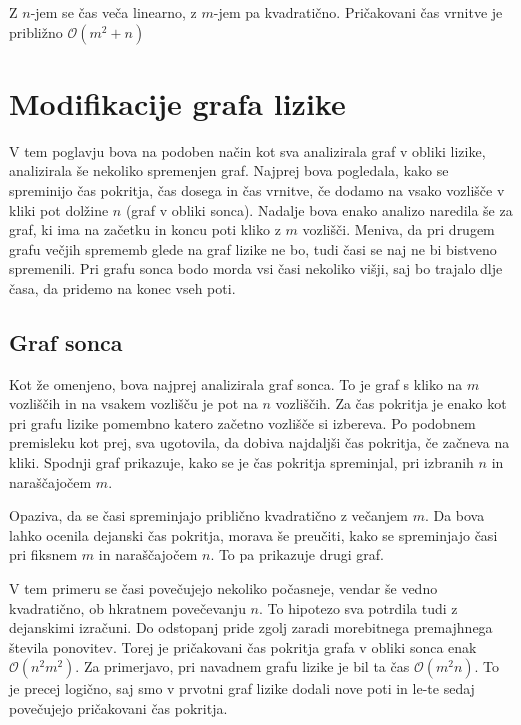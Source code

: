 \documentclass[12pt,a4paper]{amsart}
\begin{document}
Z $n$-jem se čas veča linearno, z $m$-jem pa kvadratično. Pričakovani čas vrnitve je približno $\mathcal{O}(m^2+n)$


\section{Modifikacije grafa lizike}
V tem poglavju bova na podoben način kot sva analizirala graf v obliki lizike, analizirala še nekoliko spremenjen graf. 
Najprej bova pogledala, kako se spreminijo čas pokritja, čas dosega in čas vrnitve, 
če dodamo na vsako vozlišče v kliki pot dolžine $n$ (graf v obliki sonca).
Nadalje bova enako analizo naredila še za graf, ki ima na začetku in koncu poti kliko z $m$ vozlišči. 
Meniva, da pri drugem grafu večjih sprememb glede na graf lizike ne bo, tudi časi se naj ne bi bistveno spremenili.
Pri grafu sonca bodo morda vsi časi nekoliko višji, saj bo trajalo dlje časa, da pridemo na konec vseh poti.

\subsection{Graf sonca}

Kot že omenjeno, bova najprej analizirala graf sonca. 
To je graf s kliko na $m$ vozliščih in na vsakem vozlišču je pot na $n$ vozliščih. Za čas pokritja je enako kot
pri grafu lizike pomembno katero začetno vozlišče si izbereva. Po podobnem premisleku kot prej, sva ugotovila, da dobiva
najdaljši čas pokritja, če začneva na kliki. Spodnji graf prikazuje, kako se je čas pokritja spreminjal, pri izbranih $n$
in naraščajočem $m$.

\begin{figure}
\end{figure}

Opaziva, da se časi spreminjajo priblično kvadratično z večanjem $m$. 
Da bova lahko ocenila dejanski čas pokritja,
morava še preučiti, kako se spreminjajo časi pri fiksnem $m$ in naraščajočem $n$. To pa prikazuje drugi graf.

\begin{figure}
\end{figure}

V tem primeru se časi povečujejo nekoliko počasneje, vendar še vedno kvadratično, ob hkratnem povečevanju $n$. 
To hipotezo sva potrdila tudi z dejanskimi izračuni. 
Do odstopanj pride zgolj zaradi 
morebitnega premajhnega števila ponovitev. Torej je pričakovani čas pokritja grafa v obliki sonca enak  $\mathcal{O}(n^2m^2)$. Za primerjavo,
pri navadnem grafu lizike je bil ta čas $\mathcal{O}(m^2n)$. To je precej logično, saj smo v prvotni graf lizike dodali nove poti in le-te
sedaj povečujejo pričakovani čas pokritja. 
\end{document}
